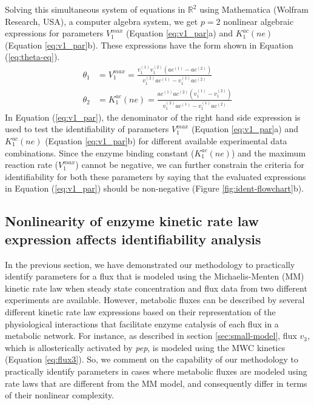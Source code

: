 \documentclass[10pt]{article}
\begin{document}
	Solving this simultaneous system of equations in $\mathbb{R}^2$ using Mathematica (Wolfram Research, USA), a computer algebra system, we get $p=2$ nonlinear algebraic expressions for parameters $V_1^{max}$ (Equation \ref{eq:v1_par}a) and $K_1^{ac}(ne)$ (Equation \ref{eq:v1_par}b). These expressions have the form shown in Equation (\ref{eq:theta-eq}).
	\begin{subequations}\label{eq:v1_par}
		\begin{align}		
		\theta_1 &= V_1^{max} = \frac{v_1^{(1)}v_1^{(2)}(ac^{(1)}-ac^{(2)})}{v_1^{(2)}ac^{(1)}-v_1^{(1)}ac^{(2)}}\\
		\theta_2 &= K_1^{ac}(ne) = \frac{ac^{(1)}ac^{(2)}(v_1^{(1)}-v_1^{(2)})}{v_1^{(2)}ac^{(1)}-v_1^{(1)}ac^{(2)}}
		\end{align}
	\end{subequations}
	In Equation (\ref{eq:v1_par}), the denominator of the right hand side expression is used to test the identifiability of parameters $V_1^{max}$ (Equation \ref{eq:v1_par}a) and $K_1^{ac}(ne)$ (Equation \ref{eq:v1_par}b) for different available experimental data combinations. Since the enzyme binding constant ($K_1^{ac}(ne)$) and the maximum reaction rate ($V_1^{max}$) cannot be negative, we can further constrain the criteria for identifiability for both these parameters by saying that the evaluated expressions in Equation (\ref{eq:v1_par}) should be non-negative (Figure \ref{fig:ident-flowchart}b). 		
	
	
	\subsection{Nonlinearity of enzyme kinetic rate law expression affects identifiability analysis}\label{sec:closedform}
	In the previous section, we have demonstrated our methodology to practically identify parameters for a flux that is modeled using the Michaelis-Menten (MM) kinetic rate law when steady state concentration and flux data from two different experiments are available. However, metabolic fluxes can be described by several different kinetic rate law expressions based on their representation of the physiological interactions that facilitate enzyme catalysis of each flux in a metabolic network. For instance, as described in section \ref{sec:small-model}, flux $v_3$, which is allosterically activated by \textit{pep}, is modeled using the MWC kinetics (Equation \ref{eq:flux3}). So, we comment on the capability of our methodology to practically identify parameters in cases where metabolic fluxes are modeled using rate laws that are different from the MM model, and consequently differ in terms of their nonlinear complexity.
	
\end{document}
